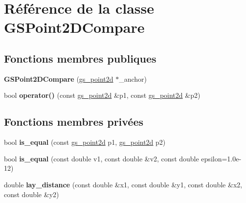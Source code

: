 \hypertarget{class_g_s_point2_d_compare}{\section{Référence de la classe G\-S\-Point2\-D\-Compare}
\label{class_g_s_point2_d_compare}
}
\subsection*{Fonctions membres publiques}
\begin{DoxyCompactItemize}
\item 
\hypertarget{class_g_s_point2_d_compare_a5f1ee29c548143850250ba4ff2a020a7}{{\bfseries G\-S\-Point2\-D\-Compare} (\hyperlink{structgs__point2d}{gs\-\_\-point2d} $\ast$\-\_\-anchor)}\label{class_g_s_point2_d_compare_a5f1ee29c548143850250ba4ff2a020a7}

\item 
\hypertarget{class_g_s_point2_d_compare_af1b994734c1817514087cd9d6a67341c}{bool {\bfseries operator()} (const \hyperlink{structgs__point2d}{gs\-\_\-point2d} \&p1, const \hyperlink{structgs__point2d}{gs\-\_\-point2d} \&p2)}\label{class_g_s_point2_d_compare_af1b994734c1817514087cd9d6a67341c}

\end{DoxyCompactItemize}
\subsection*{Fonctions membres privées}
\begin{DoxyCompactItemize}
\item 
\hypertarget{class_g_s_point2_d_compare_a79297396ba1d7e1b38c3ade487d1ccaf}{bool {\bfseries is\-\_\-equal} (const \hyperlink{structgs__point2d}{gs\-\_\-point2d} p1, \hyperlink{structgs__point2d}{gs\-\_\-point2d} p2)}\label{class_g_s_point2_d_compare_a79297396ba1d7e1b38c3ade487d1ccaf}

\item 
\hypertarget{class_g_s_point2_d_compare_a758a2bab4f965fbc52250d26e737f835}{bool {\bfseries is\-\_\-equal} (const double v1, const double \&v2, const double epsilon=1.\-0e-\/12)}\label{class_g_s_point2_d_compare_a758a2bab4f965fbc52250d26e737f835}

\item 
\hypertarget{class_g_s_point2_d_compare_aeff7984846aa78602f68eaea28b173dc}{double {\bfseries lay\-\_\-distance} (const double \&x1, const double \&y1, const double \&x2, const double \&y2)}\label{class_g_s_point2_d_compare_aeff7984846aa78602f68eaea28b173dc}

\end{DoxyCompactItemize}
